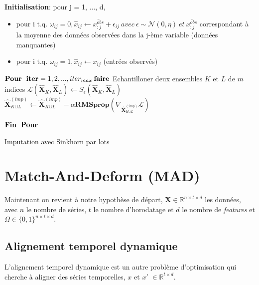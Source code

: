 \documentclass[acmsmall, natbib=false, nonacm]{acmart}
\begin{document}
\begin{algorithm}[H]
\tabto{0.2cm}\textbf{Initialisation}: pour j = 1, ..., d,
\begin{itemize}
    \item pour i t.q. $\omega_{ij} = 0, \hat{x}_{ij} \leftarrow \bar{x_{:j}^{\textit{obs}}} + \epsilon_{ij}\: avec\: \epsilon \sim \mathcal{N}(0,\eta)\: et\: \bar{x_{:j}^{\textit{obs}}}$ correspondant à la moyenne des données observées dans la j-ème variable (données manquantes)
    \item pour i t.q. $\omega_{ij} = 1, \hat{x}_{ij} \leftarrow x_{ij}$ (entrées observés)
\end{itemize}
\tabto{0.2cm}$\textbf{Pour\: iter} = 1,2, ..., iter_{max}\: \textbf{faire}$
\tabto{1cm}Echantilloner deux ensembles $\textit{K}$ et $\textit{L}$ de $\textit{m}$ indices 
\tabto{1cm}$\mathcal{L}(\hat{\textbf{X}}_{\textit{K}},\hat{\textbf{X}}_{\textit{L}}) \leftarrow S_{\epsilon}(\hat{\textbf{X}}_{\textit{K}},\hat{\textbf{X}}_{\textit{L}})$
\tabto{1cm}$\hat{\textbf{X}}_{\textit{K} \cup \textit{L}}^{(\textit{imp})} \leftarrow \hat{\textbf{X}}_{\textit{K} \cup \textit{L}}^{(\textit{imp})} - \alpha \textbf{RMSprop}(\nabla_{\hat{\textbf{X}}_{\textit{K} \cup \textit{L}}^{(\textit{imp})}} \mathcal{L})$

\tabto{0.2cm}$\textbf{Fin\: Pour}$



\caption{Imputation avec Sinkhorn par lots} 
\label{Algorithm1}

\end{algorithm}


\section{Match-And-Deform (MAD)}
Maintenant on revient à notre hypothèse de départ, 
$\textbf{X}\in \mathbb{R}^{n\times t\times d}$ les données, avec $n$ le nombre de séries, $t$ le nombre d'horodatage et $d$ le nombre de \textit{features} et $\Omega \in \{0, 1\}^{n\times t\times d}$. 

\subsection{Alignement temporel dynamique}
L'alignement temporel dynamique est un autre problème d'optimisation qui cherche à aligner des séries temporelles, $x$ et $x'$ $\in \mathbb{R}^{t\times d}$.
\end{document}
